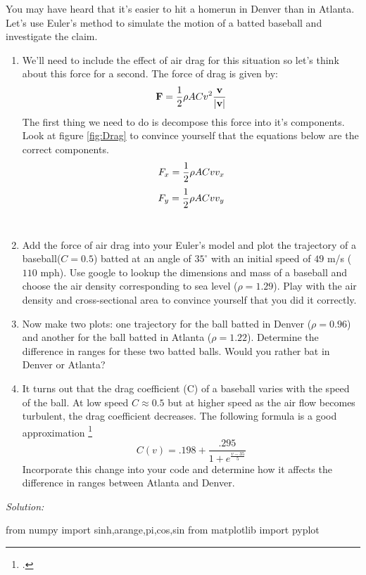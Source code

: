 \begin{enumerate}
  \probtwo \label{prob:battedBall} You may have heard that it's easier to hit a homerun in
  Denver than in Atlanta.  Let's use Euler's method to simulate the
  motion of a batted baseball and investigate the claim.
\begin{enumerate}
 \item We'll need to include the effect of air drag for this situation
   so let's think about this force for a second.  The force of drag is given by:
\begin{equation}
\mathbf{F} = {1 \over 2} \rho A C v^2 {\mathbf{v} \over |\mathbf{v}|}
\end{equation}
The first thing we need to do is decompose this force into it's
components.  Look at figure \ref{fig:Drag} to convince yourself that
the equations below are the correct components.
\begin{equation}
F_x = {1\over 2} \rho A C v v_x
\end{equation}
\begin{equation}
F_y = {1\over 2} \rho A C v v_y
\end{equation} \\

\item Add the force of air drag into your Euler's model and plot the
  trajectory of a baseball($C= 0.5$) batted at an angle of $35^\circ$
  with an initial speed of $49 $ m/s ($110$ mph). Use google to lookup
  the dimensions and mass of a baseball and choose the
  air density corresponding to sea level ($\rho = 1.29$). Play with
  the air density and cross-sectional area to convince yourself that
  you did it correctly.
\item Now make two plots: one trajectory for the ball
  batted in Denver ($\rho = 0.96$) and another for the ball batted in
  Atlanta ($ \rho = 1.22$).  Determine the difference in ranges for
  these two batted balls.  Would you rather bat in Denver or Atlanta?
\item It turns out that the drag coefficient (C) of a baseball varies
  with the speed of the ball.  At low speed $C \approx 0.5$ but at
  higher speed as the air flow becomes turbulent, the drag coefficient
  decreases.  The following formula is a good approximation \footcite{giordano1997computational}
\begin{equation}
C(v) = .198 + \frac{.295}{1 + e^{\frac{v - 35}{5}}}
\end{equation}
Incorporate this change into your code and determine how it affects
the difference in ranges between Atlanta and Denver.
 \end{enumerate}
\ifsolutions
\textit{Solution:}\\
\begin{codeexample}
\begin{VerbatimOut}{\listingFile}
from numpy import sinh,arange,pi,cos,sin
from matplotlib import pyplot




\end{VerbatimOut}
\end{codeexample}
\end{enumerate}
